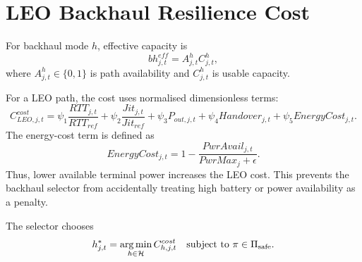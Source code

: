 \section{LEO Backhaul Resilience Cost}
\label{sec:leo-model}

For backhaul mode $h$, effective capacity is
\begin{equation}
  bh_{j,t}^{eff}=A_{j,t}^{h}C_{j,t}^{h},
  \label{eq:bh-eff}
\end{equation}
where $A_{j,t}^{h}\in\{0,1\}$ is path availability and $C_{j,t}^{h}$ is usable
capacity.

For a LEO path, the cost uses normalised dimensionless terms:
\begin{equation}
  C_{LEO,j,t}^{cost}
  =
  \psi_1\frac{RTT_{j,t}}{RTT_{ref}}
  +\psi_2\frac{Jit_{j,t}}{Jit_{ref}}
  +\psi_3P_{out,j,t}
  +\psi_4Handover_{j,t}
  +\psi_5EnergyCost_{j,t}.
  \label{eq:leo-cost}
\end{equation}
The energy-cost term is defined as
\begin{equation}
  EnergyCost_{j,t}
  =
  1-\frac{PwrAvail_{j,t}}{PwrMax_j+\epsilon}.
  \label{eq:energy-cost}
\end{equation}
Thus, lower available terminal power increases the LEO cost. This prevents the
backhaul selector from accidentally treating high battery or power availability as a
penalty.

The selector chooses
\begin{equation}
  h^*_{j,t}
  =
  \operatorname*{arg\,min}_{h\in\mathcal{H}}
  C_{h,j,t}^{cost}
  \quad
  \text{subject to }
  \pi\in\Pi_{\mathrm{safe}}.
  \label{eq:bh-selector}
\end{equation}